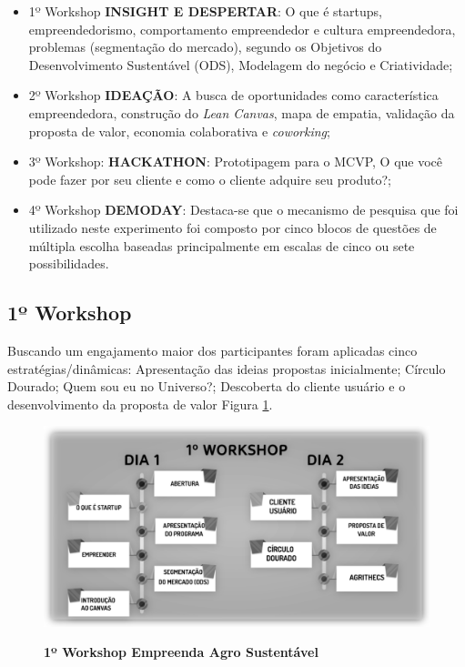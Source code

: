 \begin{itemize}

\item {1º Workshop \textbf{INSIGHT E DESPERTAR}: O que é startups, empreendedorismo, comportamento empreendedor e cultura empreendedora, problemas (segmentação do mercado), segundo os Objetivos do Desenvolvimento Sustentável (ODS), Modelagem do negócio e Criatividade;}
\item {2º Workshop \textbf{IDEAÇÃO}: A busca de oportunidades como característica empreendedora, construção do \textit{\textit{Lean Canvas}}, mapa de empatia, validação da proposta de valor, economia colaborativa e \textit{coworking};}

\item {3º Workshop: \textbf{HACKATHON}: Prototipagem para o MCVP, O que você pode fazer por seu cliente e como o cliente adquire seu produto?;}

\item {4º Workshop \textbf{DEMODAY}: Destaca-se que o mecanismo de pesquisa que foi utilizado neste experimento foi composto por cinco blocos de questões de múltipla escolha baseadas principalmente em escalas de cinco ou sete possibilidades.}
\end{itemize}


\subsection{1º Workshop}

Buscando um engajamento maior dos participantes foram
aplicadas cinco estratégias/dinâmicas: Apresentação das ideias propostas inicialmente; Círculo Dourado;
Quem sou eu no Universo?; Descoberta do cliente usuário e o  desenvolvimento da proposta de valor Figura \ref{figura_30}.

\begin{figure}[!h]
\centering
\caption{\textbf{1º Workshop Empreenda Agro Sustentável}}
\includegraphics[scale=0.3]{Imagens/workshop-01.png}
\label{figura_30}
\end{figure}

